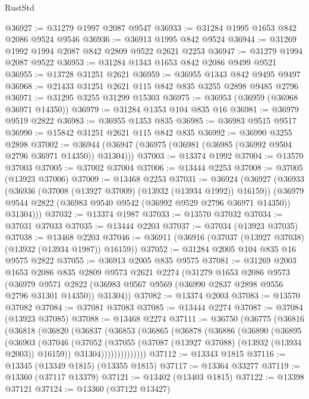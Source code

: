 \begin{lexlean}{RustStd}
\begin{coremodule}
@36927 := @31279 @1997 @2087 @9547
@36933 := @31284 @1995 @1653 @842 @2086 @9524 @9546
@36936 := @36913 @1995 @842 @9524
@36944 := @31269 @1992 @1994 @2087 @842 @2809 @9522 @2621 @2253
@36947 := @31279 @1994 @2087 @9522
@36953 := @31284 @1343 @1653 @842 @2086 @9499 @9521
@36955 := @13728 @31251 @2621
@36959 := @36955 @1343 @842 @9495 @9497
@36968 := @21433 @31251 @2621 @115 @842 @835 @3255 @2898 @9485 @2796
@36971 := @31295 @3255 @31299 @15303
@36975 := @36953 (@36959 (@36968 @36971 @14350))
@36979 := @31284 @1353 @104 @835 @16
@36981 := @36979 @9519 @2822
@36983 := @36955 @1353 @835
@36985 := @36983 @9515 @9517
@36990 := @15842 @31251 @2621 @115 @842 @835
@36992 := @36990 @3255 @2898
@37002 := @36944 (@36947 (@36975 (@36981 (@36985 (@36992 @9504 @2796 @36971 @14350)) @31304)))
@37003 := @13374 @1992
@37004 := @13570 @37003
@37005 := @37002 @37004
@37006 := @13444 @2253
@37008 := @37005 (@13923 @37006)
@37009 := @13468 @2253
@37031 := @36924
    (@36927
      (@36933
        (@36936 (@37008 (@13927 @37009) (@13932 (@13934 @1992)) @16159))
        (@36979 @9544 @2822 (@36983 @9540 @9542 (@36992 @9529 @2796 @36971 @14350)) @31304)))
@37032 := @13374 @1987
@37033 := @13570 @37032
@37034 := @37031 @37033
@37035 := @13444 @2203
@37037 := @37034 (@13923 @37035)
@37038 := @13468 @2203
@37046 := @36911 (@36916 (@37037 (@13927 @37038) (@13932 (@13934 @1987)) @16159))
@37052 := @31284 @2005 @104 @835 @16 @9575 @2822
@37055 := @36913 @2005 @835 @9575
@37081 := @31269
    @2003
    @1653
    @2086
    @835
    @2809
    @9573
    @2621
    @2274
    (@31279
      @1653
      @2086
      @9573
      (@36979
        @9571
        @2822
        (@36983 @9567 @9569 (@36990 @2837 @2898 @9556 @2796 @31301 @14350))
        @31304))
@37082 := @13374 @2003
@37083 := @13570 @37082
@37084 := @37081 @37083
@37085 := @13444 @2274
@37087 := @37084 (@13923 @37085)
@37088 := @13468 @2274
@37111 := @36750
    (@36775
      (@36816
        (@36818
          (@36820
            (@36837
              (@36853
                (@36865
                  (@36878
                    (@36886
                      (@36890
                        (@36895
                          (@36903
                            (@37046
                              (@37052
                                (@37055 (@37087 (@13927 @37088) (@13932 (@13934 @2003)) @16159))
                                @31304))))))))))))))
@37112 := @13343 @1815
@37116 := @13345 (@13349 @1815) (@13355 @1815)
@37117 := @13364 @33277
@37119 := @13360 (@37117 @13379)
@37121 := @13402 (@13403 @1815)
@37122 := @13398 @37121
@37124 := @13360 (@37122 @13427)

\end{coremodule}
\end{lexlean}
